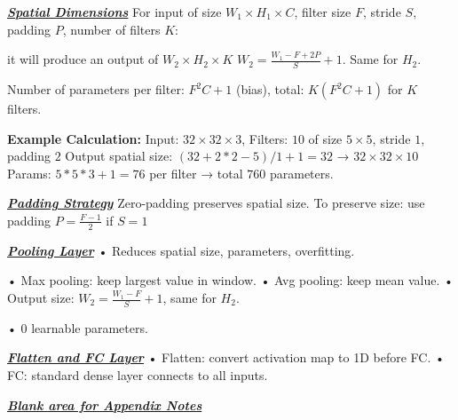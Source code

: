 \documentclass[10pt]{article}
\newcommand{\bulletPoint}[1]{\ul{\textit{\textbf{#1}}}}
\begin{document}
\begin{multicols*}{3}
\bulletPoint{Spatial Dimensions} \quad
For input of size $W_1 \times H_1 \times C$, filter size $F$, stride $S$, padding $P$, number of filters $K$:

it will produce an output of $W_2 \times H_2 \times K$
$W_2 = \frac{W_1 - F + 2P}{S} + 1$. Same for $H_2$. 

Number of parameters per filter: $F^2 C + 1$ (bias), \quad total: $K(F^2C + 1)$ for $K$ filters.\quad

\textbf{Example Calculation:} 
Input: $32 \times 32 \times 3$, Filters: $10$ of size $5 \times 5$, stride $1$, padding $2$ \quad
Output spatial size: $(32+2*2-5)/1 + 1 = 32$ → $32 \times 32 \times 10$ \quad
Params: $5*5*3 + 1 = 76$ per filter → total $760$ parameters.

\bulletPoint{Padding Strategy} \quad
Zero-padding preserves spatial size. To preserve size: use padding $P = \frac{F - 1}{2}$ if $S = 1$

\bulletPoint{Pooling Layer} \quad
• Reduces spatial size, parameters, overfitting. \quad

• Max pooling: keep largest value in window. \quad
• Avg pooling: keep mean value. \quad
• Output size: $W_2 = \frac{W_1 - F}{S} + 1$, same for $H_2$. \quad 

• 0 learnable parameters.

\bulletPoint{Flatten and FC Layer} \quad
• Flatten: convert activation map to 1D before FC. \quad
• FC: standard dense layer connects to all inputs.

\bulletPoint{Blank area for Appendix Notes}



\end{multicols*}
\end{document}

